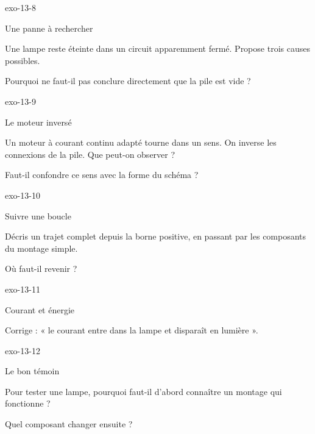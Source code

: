 \documentclass[12pt,twoside,openany]{book}
\begin{document}
\begin{blocLivre}{exo-13-8}
\begin{exercice}[2]{Une panne à rechercher}
\begin{questions}
\item Une lampe reste éteinte dans un circuit apparemment fermé. Propose trois causes possibles.
\item Pourquoi ne faut-il pas conclure directement que la pile est vide ?
\end{questions}
\end{exercice}\end{blocLivre}
\begin{blocLivre}{exo-13-9}
\begin{exercice}[2]{Le moteur inversé}
\begin{questions}
\item Un moteur à courant continu adapté tourne dans un sens. On inverse les connexions de la pile. Que peut-on observer ?
\item Faut-il confondre ce sens avec la forme du schéma ?
\end{questions}
\end{exercice}\end{blocLivre}
\begin{blocLivre}{exo-13-10}
\begin{exercice}[2]{Suivre une boucle}
\begin{questions}
\item Décris un trajet complet depuis la borne positive, en passant par les composants du montage simple.
\item Où faut-il revenir ?
\end{questions}
\end{exercice}\end{blocLivre}
\begin{blocLivre}{exo-13-11}
\begin{exercice}[2]{Courant et énergie}
\begin{questions}
\item Corrige : « le courant entre dans la lampe et disparaît en lumière ».
\end{questions}
\end{exercice}\end{blocLivre}
\clearpage
\begin{blocLivre}{exo-13-12}
\begin{exercice}[3]{Le bon témoin}
\begin{questions}
\item Pour tester une lampe, pourquoi faut-il d’abord connaître un montage qui fonctionne ?
\item Quel composant changer ensuite ?
\end{questions}
\end{exercice}\end{blocLivre}
\end{document}
